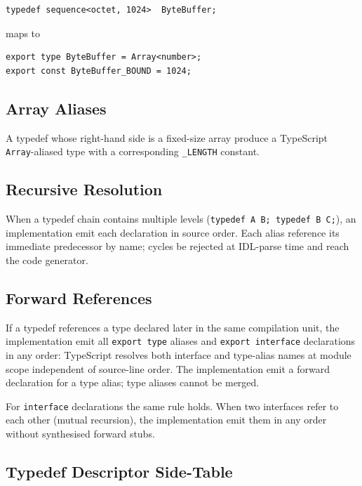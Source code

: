 \documentclass{../styles/zerodds-vendor-spec}
\begin{document}
\begin{specexample}
\begin{lstlisting}
typedef sequence<octet, 1024>  ByteBuffer;
\end{lstlisting}
maps to
\begin{lstlisting}
export type ByteBuffer = Array<number>;
export const ByteBuffer_BOUND = 1024;
\end{lstlisting}
\end{specexample}

\subsection{Array Aliases}

A typedef whose right-hand side is a fixed-size array
 produce a TypeScript \texttt{Array}-aliased type
with a corresponding \texttt{\_LENGTH} constant.

\subsection{Recursive Resolution}

When a typedef chain contains multiple levels
(\texttt{typedef A B; typedef B C;}), an implementation
 emit each declaration in source order. Each alias
 reference its immediate predecessor by name; cycles
 be rejected at IDL-parse time and 
reach the code generator.

\subsection{Forward References}

If a typedef references a type declared later in the same
compilation unit, the implementation  emit all
\texttt{export type} aliases and \texttt{export interface}
declarations in any order: TypeScript resolves both interface
and type-alias names at module scope independent of source-line
order. The implementation  emit a forward
declaration for a type alias; type aliases cannot be merged.

For \texttt{interface} declarations the same rule holds. When two
interfaces refer to each other (mutual recursion), the
implementation  emit them in any order without
synthesised forward stubs.

\subsection{Typedef Descriptor Side-Table}\label{sec:typedef-descriptor}
\end{document}
